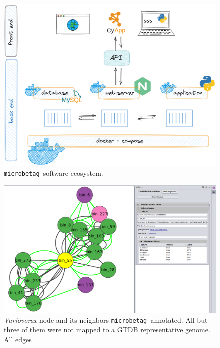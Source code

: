 \documentclass[sn-mathphys,Numbered]{sn-jnl}  %
\theoremstyle{thmstyleone}%
\theoremstyle{thmstyletwo}%
\theoremstyle{thmstylethree}%
\newcommand{\microbetag}{\texttt{microbetag }}
\begin{document}
\begin{appendices}
        \begin{figure}[H]
            \includegraphics*[width=0.9\columnwidth]{figs/architecture.png}
            \caption{
                \microbetag software ecosystem.
            }
        \label{fig:s1}
        \end{figure}
    
        \begin{figure}[H]
            \includegraphics*[width=0.9\columnwidth]{figs/node55Neigh.png}
            \caption{
                \textit{Variovorax} node and its neighbors \microbetag annotated. All but three of them were not mapped to a GTDB representative genome. 
                All edges  
            }
        \label{fig:s2}
        \end{figure}
        



\end{appendices}
\end{document}
